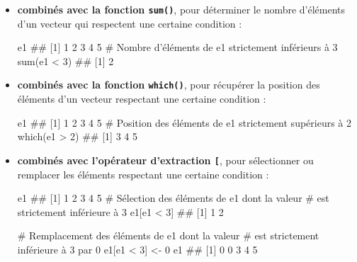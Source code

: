 \documentclass[12pt,twosided, notitlepage]{book}
\newenvironment{Shaded}{}{}
\newcommand{\CommentTok}[1]{\textcolor[rgb]{0.00,0.50,0.00}{#1}}
\newcommand{\DecValTok}[1]{#1}
\newcommand{\KeywordTok}[1]{\textcolor[rgb]{0.00,0.00,1.00}{#1}}
\newcommand{\NormalTok}[1]{#1}
\newcommand{\OperatorTok}[1]{#1}
\newcommand{\StringTok}[1]{\textcolor[rgb]{0.00,0.50,0.50}{#1}}
\renewenvironment{Shaded}{\begin{snugshade}}{\end{snugshade}}
\begin{document}
\begin{itemize}
\item
  \textbf{combinés avec la fonction \texttt{sum()}},
  pour déterminer le nombre d'éléments d'un vecteur qui respectent une
  certaine condition :

\begin{Shaded}
\begin{Highlighting}[]
\NormalTok{e1}
\NormalTok{  ## [1] 1 2 3 4 5}
\CommentTok{# Nombre d'éléments de e1 strictement inférieurs à 3}
\KeywordTok{sum}\NormalTok{(e1 }\OperatorTok{<}\StringTok{ }\DecValTok{3}\NormalTok{)}
\NormalTok{  ## [1] 2}
\end{Highlighting}
\end{Shaded}
\item
  \textbf{combinés avec la fonction
  \texttt{which()}}, pour récupérer la
  position des éléments d'un vecteur respectant une certaine condition :

\begin{Shaded}
\begin{Highlighting}[]
\NormalTok{e1}
\NormalTok{  ## [1] 1 2 3 4 5}
\CommentTok{# Position des éléments de e1 strictement supérieurs à 2}
\KeywordTok{which}\NormalTok{(e1 }\OperatorTok{>}\StringTok{ }\DecValTok{2}\NormalTok{)}
\NormalTok{  ## [1] 3 4 5}
\end{Highlighting}
\end{Shaded}
\item
  \textbf{combinés avec l'opérateur d'extraction
  \texttt{{[}}}\index{\texttt{[}}, pour sélectionner ou remplacer les
  éléments respectant une certaine condition :

\begin{Shaded}
\begin{Highlighting}[]
\NormalTok{e1}
\NormalTok{  ## [1] 1 2 3 4 5}
\CommentTok{# Sélection des éléments de e1 dont la valeur }
\CommentTok{# est strictement inférieure à 3}
\NormalTok{e1[e1 }\OperatorTok{<}\StringTok{ }\DecValTok{3}\NormalTok{]}
\NormalTok{  ## [1] 1 2}

\CommentTok{# Remplacement des éléments de e1 dont la valeur }
\CommentTok{# est strictement inférieure à 3 par 0}
\NormalTok{e1[e1 }\OperatorTok{<}\StringTok{ }\DecValTok{3}\NormalTok{] <-}\StringTok{ }\DecValTok{0}
\NormalTok{e1}
\NormalTok{  ## [1] 0 0 3 4 5}
\end{Highlighting}
\end{Shaded}
\end{itemize}
\end{document}
